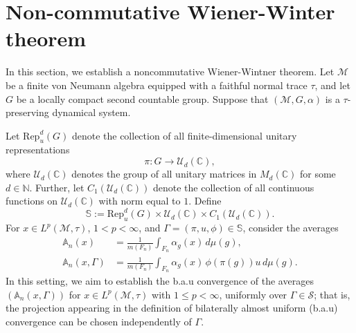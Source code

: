 \documentclass[11pt]{amsart}
\theoremstyle{definition}
\theoremstyle{myremark}
\numberwithin{equation}{section}
\def\A{\mathbb A}
\def\C{\mathbb C}
\def\N{\mathbb N}
\def\S{\mathbb S}
\newcommand{\CM}{\mathcal{M}}
\newcommand{\CU}{\mathcal{U}}
\begin{document}

























\section{ \bf Non-commutative Wiener-Winter theorem } 

 In this section, we establish a noncommutative Wiener-Wintner theorem. Let $\CM$ be a finite von Neumann algebra equipped with a faithful normal trace $\tau$, and let $G$ be a locally compact second countable group. Suppose that $(\CM,G,\alpha)$ is a $\tau$-preserving dynamical system. 

\medskip
\noindent
Let $\mathrm{Rep}^d_u(G)$ denote the collection of all finite-dimensional unitary representations
\[
\pi : G \to \CU_d(\C),
\]
where $\CU_d(\C)$ denotes the group of all unitary matrices in $M_d(\C)$ for some $d \in \N$. Further, let $C_1(\CU_d(\C))$
denote the collection of all continuous functions on $\CU_d(\C)$ with norm equal to $1$. Define
\[
\S := \mathrm{Rep}^d_u(G)\times \CU_d(\C)\times C_1(\CU_d(\C)).
\]
For $x \in L^p(\CM,\tau)$, $1<p<\infty$, and $\Gamma=(\pi,u,\phi)\in \S$, consider the averages
\begin{align*}
\A_n(x)
&=
\frac{1}{m(F_n)}
\int_{F_n}\alpha_g(x)\, d\mu(g),\\
\A_n(x,\Gamma)
&=
\frac{1}{m(F_n)}
\int_{F_n}\alpha_g(x)\,\phi(\pi(g))u \, d\mu(g).
\end{align*}
In this setting, we aim to establish the b.a.u  convergence of the averages  $( \A_n(x,\Gamma))$ for $ x \in L^p(\CM, \tau)$ with $  1 \leq p < \infty$, 
uniformly over $\Gamma \in \mathcal{S}$; that is, the projection appearing in the definition of bilaterally almost uniform (b.a.u) convergence can be chosen independently of $\Gamma$.
\end{document}
